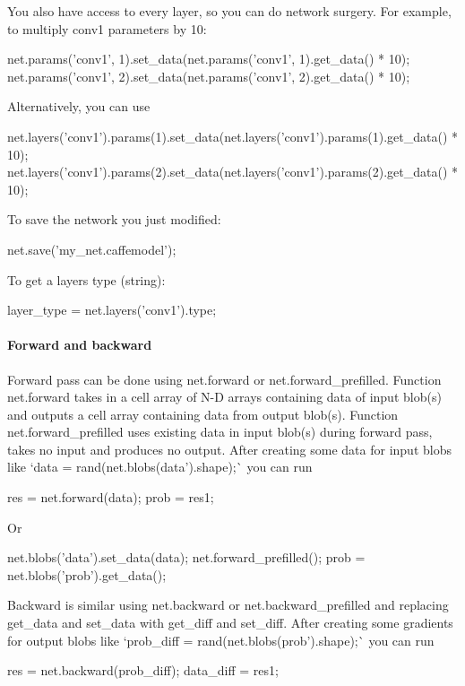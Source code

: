 You also have access to every layer, so you can do network surgery. For example, to multiply conv1 parameters by 10\+: \begin{DoxyVerb}net.params('conv1', 1).set_data(net.params('conv1', 1).get_data() * 10); %
net.params('conv1', 2).set_data(net.params('conv1', 2).get_data() * 10); %
\end{DoxyVerb}


Alternatively, you can use \begin{DoxyVerb}net.layers('conv1').params(1).set_data(net.layers('conv1').params(1).get_data() * 10);
net.layers('conv1').params(2).set_data(net.layers('conv1').params(2).get_data() * 10);
\end{DoxyVerb}


To save the network you just modified\+: \begin{DoxyVerb}net.save('my_net.caffemodel');
\end{DoxyVerb}


To get a layer\textquotesingle{}s type (string)\+: \begin{DoxyVerb}layer_type = net.layers('conv1').type;
\end{DoxyVerb}


\paragraph*{Forward and backward}

Forward pass can be done using {\ttfamily net.\+forward} or {\ttfamily net.\+forward\+\_\+prefilled}. Function {\ttfamily net.\+forward} takes in a cell array of N-\/D arrays containing data of input blob(s) and outputs a cell array containing data from output blob(s). Function {\ttfamily net.\+forward\+\_\+prefilled} uses existing data in input blob(s) during forward pass, takes no input and produces no output. After creating some data for input blobs like `data = rand(net.\+blobs(\textquotesingle{}data').shape);\`{} you can run \begin{DoxyVerb}res = net.forward({data});
prob = res{1};
\end{DoxyVerb}


Or \begin{DoxyVerb}net.blobs('data').set_data(data);
net.forward_prefilled();
prob = net.blobs('prob').get_data();
\end{DoxyVerb}


Backward is similar using {\ttfamily net.\+backward} or {\ttfamily net.\+backward\+\_\+prefilled} and replacing {\ttfamily get\+\_\+data} and {\ttfamily set\+\_\+data} with {\ttfamily get\+\_\+diff} and {\ttfamily set\+\_\+diff}. After creating some gradients for output blobs like `prob\+\_\+diff = rand(net.\+blobs(\textquotesingle{}prob').shape);\`{} you can run \begin{DoxyVerb}res = net.backward({prob_diff});
data_diff = res{1};
\end{DoxyVerb}


